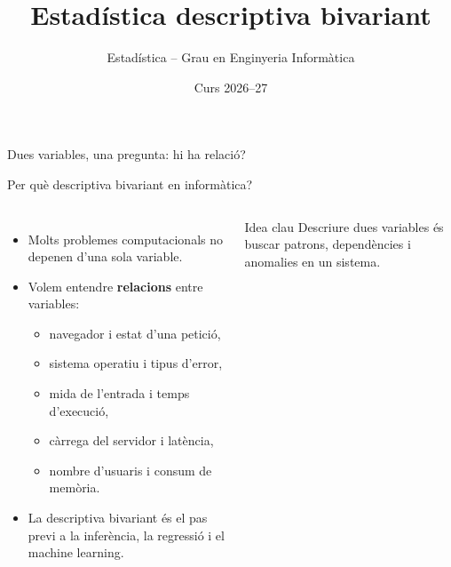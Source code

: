 \documentclass[10pt,aspectratio=169]{beamer}
\title[Descriptiva bivariant computacional]{Estadística descriptiva bivariant}
\author{Estadística -- Grau en Enginyeria Informàtica}
\date{Curs 2026--27}
\newcommand{\important}[1]{\textcolor{UABGreen}{\textbf{#1}}}
\begin{document}
\begin{frame}[plain]
  \titlepage
  \vspace{-0.5cm}
  \begin{center}
  \small
  \textcolor{DeepBlue}{Dues variables, una pregunta: hi ha relació?}
  \end{center}
\end{frame}

\begin{frame}{Per què descriptiva bivariant en informàtica?}
\begin{columns}[T]
\begin{itemize}
  \item Molts problemes computacionals no depenen d'una sola variable.
  \item Volem entendre \important{relacions} entre variables:
  \begin{itemize}
    \item navegador i estat d'una petició,
    \item sistema operatiu i tipus d'error,
    \item mida de l'entrada i temps d'execució,
    \item càrrega del servidor i latència,
    \item nombre d'usuaris i consum de memòria.
  \end{itemize}
  \item La descriptiva bivariant és el pas previ a la inferència, la regressió i el machine learning.
\end{itemize}
\begin{block}{Idea clau}
Descriure dues variables és buscar patrons, dependències i anomalies en un sistema.
\end{block}
\vspace{0.2cm}
\end{columns}
\end{frame}
\end{document}
